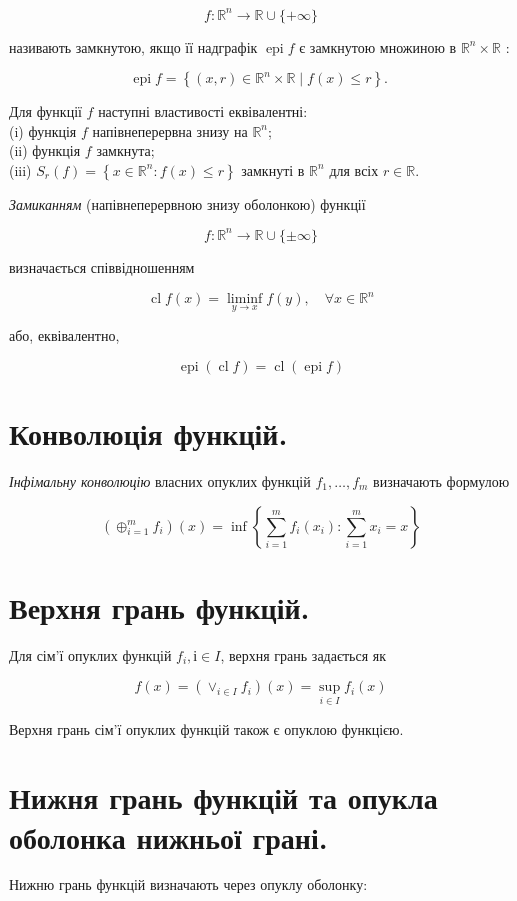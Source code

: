 \documentclass[12pt,a4paper]{extarticle}
\numberwithin{section}{part}
\begin{document}
$$
f: \mathbb{R}^{n} \rightarrow \mathbb{R} \cup\{+\infty\}
$$

називають замкнутою, якщо її надграфік $\operatorname{epi} f$ є замкнутою множиною в $\mathbb{R}^{n} \times \mathbb{R}$ :

$$
\operatorname{epi} f=\left\{(x, r) \in \mathbb{R}^{n} \times \mathbb{R} \mid f(x) \leq r\right\} \text {. }
$$

Для функції $f$ наступні властивості еквівалентні:\\
(i) функція $f$ напівнеперервна знизу на $\mathbb{R}^{n}$;\\
(ii) функція $f$ замкнута;\\
(iii) $S_{r}(f)=\left\{x \in \mathbb{R}^{n}: f(x) \leq r\right\}$ замкнуті в $\mathbb{R}^{n}$ для всіх $r \in \mathbb{R}$.

\textit{Замиканням} (напівнеперервною знизу оболонкою) функції

$$
f: \mathbb{R}^{n} \rightarrow \mathbb{R} \cup\{ \pm \infty\}
$$

визначається співвідношенням

$$
\operatorname{cl} f(x)=\liminf _{y \rightarrow x} f(y), \quad \forall x \in \mathbb{R}^{n}
$$

або, еквівалентно,

$$
\operatorname{epi}(\operatorname{cl} f)=\operatorname{cl}(\operatorname{epi} f)
$$

\section{Конволюція функцій.}
\textit{Інфімальну конволюцію} власних опуклих функцій $f_{1}, \ldots, f_{m}$ визначають формулою

$$
\left(\oplus_{i=1}^{m} f_{i}\right)(x)=\inf \left\{\sum_{i=1}^{m} f_{i}\left(x_{i}\right): \sum_{i=1}^{m} x_{i}=x\right\}
$$

\section{Верхня грань функцій.}
Для сім'ї опуклих функцій $f_{i}, і \in I$, верхня грань задається як

$$
f(x)=\left(\vee_{i \in I} f_{i}\right)(x)=\sup _{i \in I} f_{i}(x)
$$

Верхня грань сім'ї опуклих функцій також є опуклою функцією.

\section{Нижня грань функцій та опукла оболонка нижньої грані.}
Нижню грань функцій визначають через опуклу оболонку:
\end{document}
